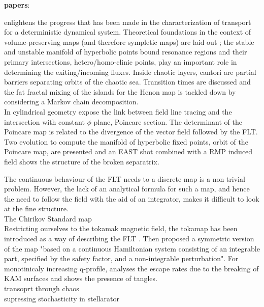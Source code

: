\textbf{papers}:

\cite{meiss_thirty_2015} enlightens the progress that has been made in the characterization of transport for a deterministic dynamical system. Theoretical foundations in the context of volume-preserving maps (and therefore sympletic maps) are laid out ; the stable and unstable manifold of hyperbolic points bound resonance regions and their primary intersections, hetero/homo-clinic points, play an important role in determining the exiting/incoming fluxes. Inside chaotic layers, cantori are partial barriers separating orbits of the chaotic sea. Transition times are discussed and the fat fractal mixing of the islands for the Henon map is tackled down by considering a Markov chain decomposition.
\\[10pt]
In cylindrical geometry \cite{wei_invariant_2023} expose the link between field line tracing and the intersection with constant $\phi$ plane, Poincare section. The determinant of the Poincare map is related to the divergence of the vector field followed by the FLT. Two evolution to compute the manifold of hyperbolic fixed points, orbit of the Poincare map, are presented and an EAST shot combined with a RMP induced field shows the structure of the broken separatrix.

The continuous behaviour of the FLT needs to a discrete map is a non trivial problem.
However, the lack of an analytical formula for such a map, and hence the need to follow the field with the aid of an integrator, makes it difficult to look at the fine structure.
\\[10pt]
The Chirikov Standard map  
\\[10pt]
Restricting ourselves to the tokamak magnetic field, the tokamap has been introduced as a way of describing the FLT \cite{}. Then \cite{8} proposed a symmetric version of the map "based on a continuous Hamiltonian system consisting of an integrable part, specified by the safety factor, and a non-integrable perturbation". For monotinicaly increasing q-profile, \cite{wingen_stochastic_2005} analyses the escape rates due to the breaking of KAM surfaces and shows the presence of tangles. 
\\[10pt]
transoprt through chaos \cite{easton_transport_1991}
\\[10pt]
supressing stochasticity in stellarator \cite{hanson_elimination_1984}
\\[10pt]


